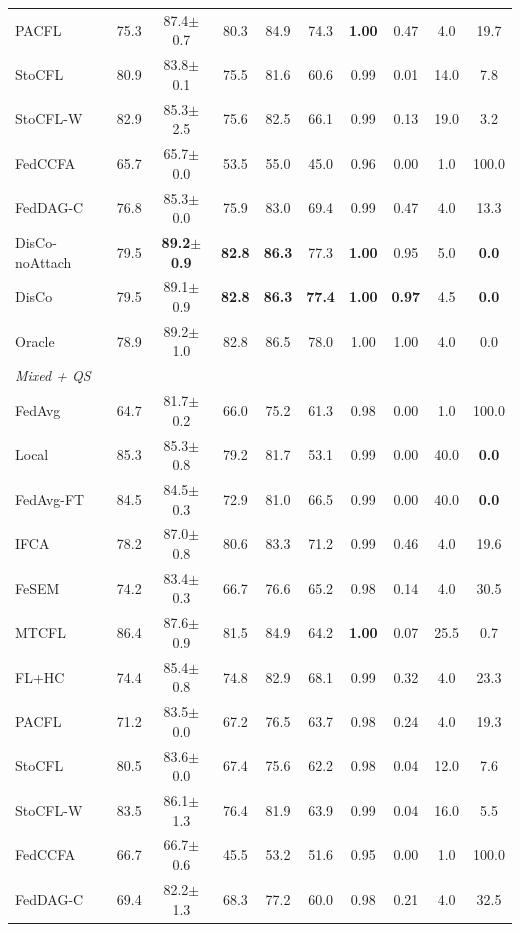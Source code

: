 \begin{tabular}{lccccccccc}
PACFL & 75.3 & 87.4$\pm$0.7 & 80.3 & 84.9 & 74.3 & \textbf{1.00} & 0.47 & 4.0 & 19.7 \\
StoCFL & 80.9 & 83.8$\pm$0.1 & 75.5 & 81.6 & 60.6 & 0.99 & 0.01 & 14.0 & 7.8 \\
StoCFL-W & 82.9 & 85.3$\pm$2.5 & 75.6 & 82.5 & 66.1 & 0.99 & 0.13 & 19.0 & 3.2 \\
FedCCFA & 65.7 & 65.7$\pm$0.0 & 53.5 & 55.0 & 45.0 & 0.96 & 0.00 & 1.0 & 100.0 \\
FedDAG-C & 76.8 & 85.3$\pm$0.0 & 75.9 & 83.0 & 69.4 & 0.99 & 0.47 & 4.0 & 13.3 \\
DisCo-noAttach & 79.5 & \textbf{89.2$\pm$0.9} & \textbf{82.8} & \textbf{86.3} & 77.3 & \textbf{1.00} & 0.95 & 5.0 & \textbf{0.0} \\
DisCo & 79.5 & 89.1$\pm$0.9 & \textbf{82.8} & \textbf{86.3} & \textbf{77.4} & \textbf{1.00} & \textbf{0.97} & 4.5 & \textbf{0.0} \\
Oracle & 78.9 & 89.2$\pm$1.0 & 82.8 & 86.5 & 78.0 & 1.00 & 1.00 & 4.0 & 0.0 \\
\midrule
\multicolumn{10}{l}{\textit{Mixed + QS}}\\
FedAvg & 64.7 & 81.7$\pm$0.2 & 66.0 & 75.2 & 61.3 & 0.98 & 0.00 & 1.0 & 100.0 \\
Local & 85.3 & 85.3$\pm$0.8 & 79.2 & 81.7 & 53.1 & 0.99 & 0.00 & 40.0 & \textbf{0.0} \\
FedAvg-FT & 84.5 & 84.5$\pm$0.3 & 72.9 & 81.0 & 66.5 & 0.99 & 0.00 & 40.0 & \textbf{0.0} \\
IFCA & 78.2 & 87.0$\pm$0.8 & 80.6 & 83.3 & 71.2 & 0.99 & 0.46 & 4.0 & 19.6 \\
FeSEM & 74.2 & 83.4$\pm$0.3 & 66.7 & 76.6 & 65.2 & 0.98 & 0.14 & 4.0 & 30.5 \\
MTCFL & 86.4 & 87.6$\pm$0.9 & 81.5 & 84.9 & 64.2 & \textbf{1.00} & 0.07 & 25.5 & 0.7 \\
FL+HC & 74.4 & 85.4$\pm$0.8 & 74.8 & 82.9 & 68.1 & 0.99 & 0.32 & 4.0 & 23.3 \\
PACFL & 71.2 & 83.5$\pm$0.0 & 67.2 & 76.5 & 63.7 & 0.98 & 0.24 & 4.0 & 19.3 \\
StoCFL & 80.5 & 83.6$\pm$0.0 & 67.4 & 75.6 & 62.2 & 0.98 & 0.04 & 12.0 & 7.6 \\
StoCFL-W & 83.5 & 86.1$\pm$1.3 & 76.4 & 81.9 & 63.9 & 0.99 & 0.04 & 16.0 & 5.5 \\
FedCCFA & 66.7 & 66.7$\pm$0.6 & 45.5 & 53.2 & 51.6 & 0.95 & 0.00 & 1.0 & 100.0 \\
FedDAG-C & 69.4 & 82.2$\pm$1.3 & 68.3 & 77.2 & 60.0 & 0.98 & 0.21 & 4.0 & 32.5 \\

\end{tabular}
